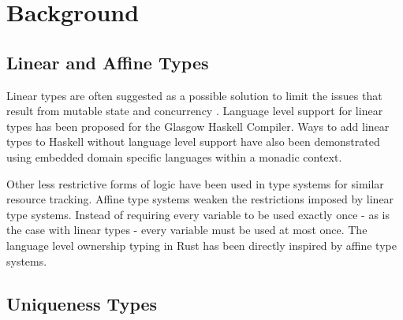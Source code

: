 \documentclass[onehalf,11pt]{beavtex}
\begin{document}



\chapter{Background}

\section{Linear and Affine Types}

Linear types are often suggested as a possible solution to limit the issues that
result from mutable state \cite{Wadler90lineartypes} and concurrency
\cite{caires2010session}.  Language level support for linear types has been
proposed for the Glasgow Haskell Compiler. \cite{LinearTypesGHC}
Ways to add linear types to Haskell without language level support have also
been demonstrated using embedded domain specific languages within a monadic
context. \cite{Paykin:2017:LM:3122955.3122965}

Other less restrictive forms of logic have been used in type systems for similar
resource tracking.
Affine type systems weaken the restrictions imposed by linear type systems.
Instead of requiring every variable to be used exactly once - as is the case
with linear types - every variable must be used at most once.
The language level ownership typing in Rust has been directly inspired by affine
type systems.

\section{Uniqueness Types}
\end{document}
